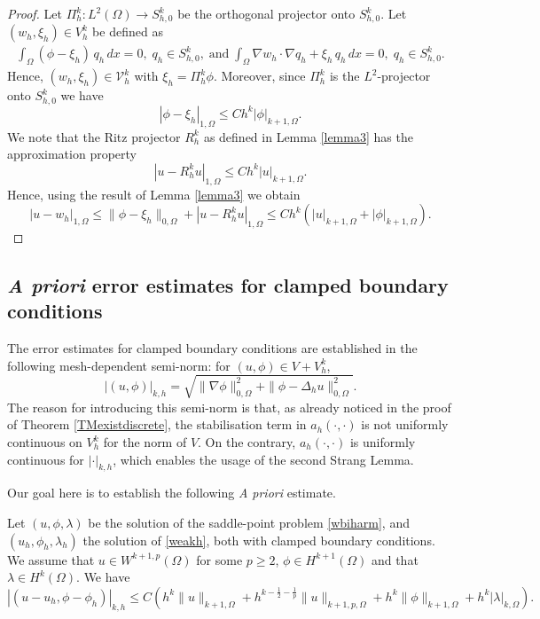 \documentclass[a4paper,final]{siamltex}
\newcommand{\CV}{\mathcal{V}}
\def\snorm#1#2{|#1|_{#2}}
\begin{document}
\begin{proof}
Let $\Pi_h^k:L^2(\Omega) \to S^k_{h,0}$ be the orthogonal projector onto $S^k_{h,0}$. 
Let $(w_h,\xi_h) \in V^k_h$ be defined as 
\begin{eqnarray*}
\int_{\Omega} (\phi -\xi_h)\,q_h \,dx = 0,\; q_h \in S^k_{h,0},\;\text{and}\;
\int_{\Omega} \nabla w_h\cdot\nabla q_h + \xi_h\,q_h\,dx = 0,\; q_h \in S^k_{h,0}.
\end{eqnarray*}
Hence, $(w_h,\xi_h) \in \CV^k_h$ with $\xi_h =\Pi_h^k \phi$.
Moreover, since $\Pi_h^k$ is 
the $L^2$-projector onto $S^k_{h,0}$ we have \cite{Bra01}
\[
|\phi - \xi_h|_{1,\Omega} 
\leq C h^k |\phi|_{k+1,\Omega}.
\]
We note that the Ritz projector $R_h^k$ as defined in Lemma \ref{lemma3}
has the approximation property \cite{Tho97} \[
|u-R_h^k u|_{1,\Omega}\leq C h^k |u|_{k+1,\Omega}.\]
Hence, using the result of Lemma \ref{lemma3} 
we obtain 
\[|u-w_h|_{1,\Omega}\leq \|\phi - \xi_h\|_{0,\Omega}+ |u-R_h^ku|_{1,\Omega}
\leq C h^k( |u|_{k+1,\Omega}+ |\phi|_{k+1,\Omega}).
\]
\end{proof}

\subsection{\emph{A priori} error estimates for clamped boundary conditions}\label{sec:convergence.clamped}


The error estimates for clamped boundary conditions are established in the following mesh-dependent
semi-norm: for $(u,\phi)\in V+V_h^k$,
\begin{equation}\label{norm}
\snorm{(u, \phi)}{k,h}  = \sqrt{ \|\nabla \phi\|^2_{0,\Omega}  + \|\phi  -\Delta_h u \|^2_{0,\Omega} }.
\end{equation}
The reason for introducing this semi-norm is that, as already noticed in the proof of Theorem \ref{TMexistdiscrete}, 
the stabilisation term in $a_h(\cdot,\cdot)$ is not uniformly continuous on $V_h^k$ for the norm of $V$.
On the contrary, $a_h(\cdot,\cdot)$ is uniformly continuous for $\snorm{\cdot}{k,h}$, which enables the usage
of the second Strang Lemma.

Our goal here is to establish the following \emph{A priori} estimate.

\begin{theorem}\label{th1}
Let $(u,\phi,\lambda)$ be the solution of the saddle-point problem 
\eqref{wbiharm}, and $(u_h,\phi_h,\lambda_h)$ the solution of \eqref{weakh}, both with
clamped boundary conditions.
We assume that $u\in W^{k+1,p}(\Omega)$ for some $p\ge 2$, $\phi \in H^{k+1}(\Omega)$ and that
$\lambda\in H^k(\Omega)$. 
We have  
\begin{equation} \label{eq:strangn2}
\snorm{(u-u_h,\phi-\phi_h)}{k,h}
\leq 
C \left( h^{k} \|u\|_{k+1,\Omega} + 
h^{k-\frac{1}{2} - \frac{1}{p}} \|u\|_{k+1,p,\Omega}+h^k\|\phi\|_{k+1,\Omega}+ h^k |\lambda|_{k,\Omega}\right).
\end{equation}
\end{theorem}
\end{document}
